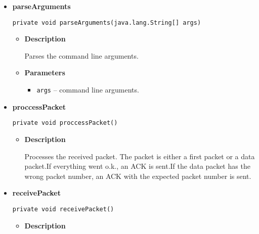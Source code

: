 {{{{{{\begin{itemize}
{\begin{itemize}
{Calls Server(args) and thereby starts the server.
}
\item{
{\bf  Parameters}
  \begin{itemize}
   \item{
\texttt{args} -- command line arguments}
  \end{itemize}
}%
\end{itemize}
}%
\item{ 
\hypertarget{filetransferUDP.Server.parseArguments(java.lang.String[])}{{\bf  parseArguments}\\}
\begin{lstlisting}[frame=none]
private void parseArguments(java.lang.String[] args)\end{lstlisting} %
\begin{itemize}
\item{
{\bf  Description}

Parses the command line arguments.
}
\item{
{\bf  Parameters}
  \begin{itemize}
   \item{
\texttt{args} -- command line arguments.}
  \end{itemize}
}%
\end{itemize}
}%
\item{ 
\hypertarget{filetransferUDP.Server.proccessPacket()}{{\bf  proccessPacket}\\}
\begin{lstlisting}[frame=none]
private void proccessPacket()\end{lstlisting} %
\begin{itemize}
\item{
{\bf  Description}

Processes the received packet. The packet is either a first packet or a data packet.\mbox{}\newline If everything went o.k., an ACK is sent.\mbox{}\newline If the data packet has the wrong packet number, an ACK with the expected packet number is sent.
}
\end{itemize}
}%
\item{ 
\hypertarget{filetransferUDP.Server.receivePacket()}{{\bf  receivePacket}\\}
\begin{lstlisting}[frame=none]
private void receivePacket()\end{lstlisting} %
\begin{itemize}
\item{
{\bf  Description}

}
\end{itemize}}
\end{itemize}}}}}}}
